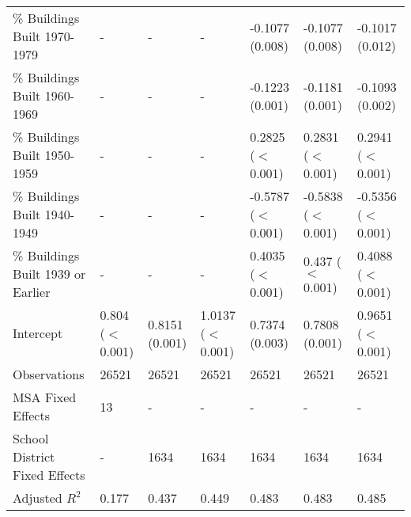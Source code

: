 \begin{landscape}
\begin{table}[h]
\begin{tabular}{l|llllll}
\% Buildings Built 1970-1979 &- & - & - & -0.1077 (0.008) & -0.1077 (0.008) & -0.1017 (0.012) \\
\% Buildings Built 1960-1969 &- & - & - & -0.1223 (0.001) & -0.1181 (0.001) & -0.1093 (0.002) \\
\% Buildings Built 1950-1959 &- & - & - & 0.2825 ($<$0.001) & 0.2831 ($<$0.001) & 0.2941 ($<$0.001) \\
\% Buildings Built 1940-1949 &- & - & - & -0.5787 ($<$0.001) & -0.5838 ($<$0.001) & -0.5356 ($<$0.001) \\
\% Buildings Built 1939 or Earlier &- & - & - & 0.4035 ($<$0.001) & 0.437 ($<$0.001) & 0.4088 ($<$0.001) \\
Intercept &0.804 ($<$0.001) & 0.8151 (0.001) & 1.0137 ($<$0.001) & 0.7374 (0.003) & 0.7808 (0.001) & 0.9651 ($<$0.001) \\
Observations &26521 & 26521 & 26521 & 26521 & 26521 & 26521 \\
MSA Fixed Effects &13 & - & - & - & - & - \\
School District Fixed Effects &- & 1634 & 1634 & 1634 & 1634 & 1634 \\
Adjusted $R^2$ &0.177 & 0.437 & 0.449 & 0.483 & 0.483 & 0.485 \\\hline
\end{tabular}
\end{table}
\newpage
\end{landscape}
\restoregeometry
